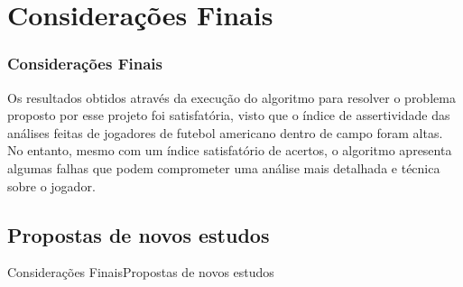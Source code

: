 \section{Considerações Finais}
\begin{frame}
\frametitle{Considerações Finais}
\label{consideracoes_finais}

Os resultados obtidos através da execução do algoritmo para resolver o problema proposto por esse projeto foi satisfatória, visto que o índice de assertividade das análises feitas de jogadores de futebol americano dentro de campo foram altas. No entanto, mesmo com um índice satisfatório de acertos, o algoritmo apresenta algumas falhas que podem comprometer uma análise mais detalhada e técnica sobre o jogador.

\end{frame}


\subsection{Propostas de novos estudos}
\begin{frame}{Considerações Finais}{Propostas de novos estudos}

\end{frame}